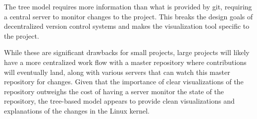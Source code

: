 \documentclass[conference, draftclsnofoot, draft]{IEEEtran}
\begin{document}
The tree model requires more information than what is provided by git, requiring a
central server to monitor changes to the project. This breaks the design goals of
decentralized version control systems and makes the visualization tool specific to
the project.

While these are significant drawbacks for small projects, large projects will likely
have a more centralized work flow with a master repository where contributions will
eventually land, along with various servers that can watch this master repository
for changes. Given that the importance of clear visualizations of the repository
outweighs the cost of having a server monitor the state of the repository, the
tree-based model appears to provide clean visualizations and explanations of the
changes in the Linux kernel.

\nocite{*}



\end{document}
